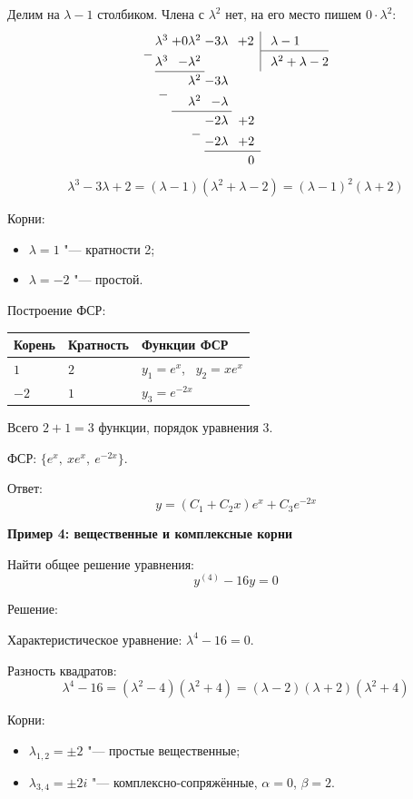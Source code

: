 \documentclass[11pt,a4paper]{article}
\makeatletter
\newcommand{\example}[1]{\par\medskip\noindent\textbf{#1}\par\nopagebreak\smallskip}
\newcommand{\sub}{\raisebox{1.4ex}{$-$}}
\newcommand{\nb}[1]{\multicolumn{1}{r}{#1}}
\newenvironment{fsrtable}{\begin{center}\begin{tabular}{@{}lll@{}}\toprule
Корень & Кратность & Функции ФСР\\\midrule}{\\\bottomrule\end{tabular}\end{center}}
\makeatother
\begin{document}
Делим на $\lambda - 1$ столбиком. Члена с $\lambda^2$ нет, на его место пишем $0 \cdot \lambda^2$:
\[
\renewcommand{\arraystretch}{1.25}
\begin{array}{@{}c@{\,}r@{\;}r@{\;}r@{\;}r|l@{}}
       & \lambda^3 & +0\lambda^2 & -3\lambda & +2 & \;\lambda - 1\\ \cline{6-6}
  \sub & \lambda^3 & -\lambda^2  &           & \  & \;\lambda^2 + \lambda - 2\\ \cline{2-3}
       &           & \lambda^2   & -3\lambda & \nb{}\\
       &      \sub & \lambda^2   & -\lambda  & \nb{}\\ \cline{3-4}
       &           &             & -2\lambda & \nb{+2}\\
       &           &        \sub & -2\lambda & \nb{+2}\\ \cline{4-5}
       &           &             &           & \nb{0}
\end{array}
\]
\[
  \lambda^3 - 3\lambda + 2 = (\lambda - 1)(\lambda^2 + \lambda - 2) = (\lambda - 1)^2(\lambda + 2)
\]

Корни:
\begin{itemize}
  \item $\lambda = 1$ "--- кратности 2;
  \item $\lambda = -2$ "--- простой.
\end{itemize}
\vspace{2cm}

Построение ФСР:
\begin{fsrtable}
$1$ & $2$ & $y_1 = e^{x}$, \ $y_2 = x e^{x}$\\
$-2$ & $1$ & $y_3 = e^{-2x}$
\end{fsrtable}

Всего $2 + 1 = 3$ функции, порядок уравнения 3.

ФСР: $\{e^{x},\ x e^{x},\ e^{-2x}\}$.

Ответ:
\[
  y = (C_1 + C_2 x)e^{x} + C_3 e^{-2x}
\]

\example{Пример 4: вещественные и комплексные корни}

Найти общее решение уравнения:
\[
  y^{(4)} - 16y = 0
\]

Решение:

Характеристическое уравнение: $\lambda^4 - 16 = 0$.

Разность квадратов:
\[
  \lambda^4 - 16 = (\lambda^2 - 4)(\lambda^2 + 4) = (\lambda - 2)(\lambda + 2)(\lambda^2 + 4)
\]

Корни:
\begin{itemize}
  \item $\lambda_{1,2} = \pm 2$ "--- простые вещественные;
  \item $\lambda_{3,4} = \pm 2i$ "--- комплексно-сопряжённые, $\alpha = 0$, $\beta = 2$.
\end{itemize}
\end{document}
